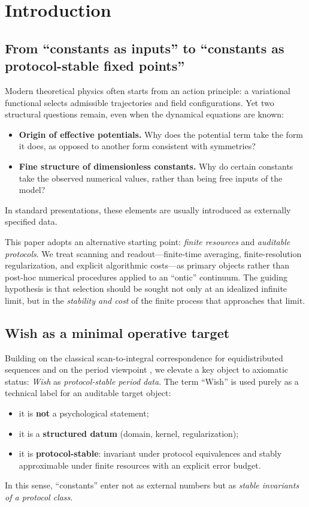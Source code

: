 
\section{Introduction}
\label{sec:introduction}

\subsection{From ``constants as inputs'' to ``constants as protocol-stable fixed points''}
\label{sec:intro_constants_as_fixed_points}

Modern theoretical physics often starts from an action principle: a variational functional selects admissible trajectories and field configurations.
Yet two structural questions remain, even when the dynamical equations are known:
\begin{itemize}
\item \textbf{Origin of effective potentials.} Why does the potential term take the form it does, as opposed to another form consistent with symmetries?
\item \textbf{Fine structure of dimensionless constants.} Why do certain constants take the observed numerical values, rather than being free inputs of the model?
\end{itemize}
In standard presentations, these elements are usually introduced as externally specified data.

This paper adopts an alternative starting point: \emph{finite resources} and \emph{auditable protocols}.
We treat scanning and readout---finite-time averaging, finite-resolution regularization, and explicit algorithmic costs---as primary objects rather than post-hoc numerical procedures applied to an ``ontic'' continuum.
The guiding hypothesis is that selection should be sought not only at an idealized infinite limit, but in the \emph{stability and cost} of the finite process that approaches that limit.

\subsection{Wish as a minimal operative target}
\label{sec:intro_wish}

Building on the classical scan-to-integral correspondence for equidistributed sequences \cite{Weyl1916,KuipersNiederreiter1974} and on the period viewpoint \cite{KontsevichZagier2001}, we elevate a key object to axiomatic status:
\emph{Wish} as \emph{protocol-stable period data}.
The term ``Wish'' is used purely as a technical label for an auditable target object:
\begin{itemize}
\item it is \textbf{not} a psychological statement;
\item it is a \textbf{structured datum} (domain, kernel, regularization);
\item it is \textbf{protocol-stable}: invariant under protocol equivalences and stably approximable under finite resources with an explicit error budget.
\end{itemize}
In this sense, ``constants'' enter not as external numbers but as \emph{stable invariants of a protocol class}.

